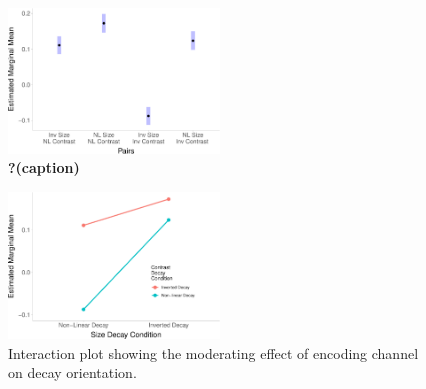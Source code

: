 \documentclass[manuscript, review, anonymous, screen]{acmart}
\begin{document}
\begin{figure}

\includegraphics[width=0.5\textwidth,height=\textheight]{size_and_contrast_new_files/figure-pdf/fig-emm-plot-1.pdf} \hfill{}

\caption{\label{fig-emm-plot}\textbf{?(caption)}}

\end{figure}

\begin{figure}

\includegraphics[width=0.5\textwidth,height=\textheight]{size_and_contrast_new_files/figure-pdf/fig-interaction-plot-1.pdf} \hfill{}

\caption{\label{fig-interaction-plot}Interaction plot showing the
moderating effect of encoding channel on decay orientation.}

\end{figure}
\end{document}
